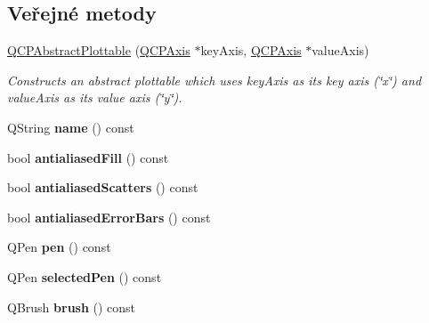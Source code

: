 \subsection*{Veřejné metody}
\begin{DoxyCompactItemize}
\item 
\hyperlink{classQCPAbstractPlottable_af78a036e40db6f53a31abadc5323715a}{Q\+C\+P\+Abstract\+Plottable} (\hyperlink{classQCPAxis}{Q\+C\+P\+Axis} $\ast$key\+Axis, \hyperlink{classQCPAxis}{Q\+C\+P\+Axis} $\ast$value\+Axis)
\begin{DoxyCompactList}\small\item\em Constructs an abstract plottable which uses {\itshape key\+Axis} as its key axis (\char`\"{}x\char`\"{}) and {\itshape value\+Axis} as its value axis (\char`\"{}y\char`\"{}). \end{DoxyCompactList}\item 
\hypertarget{classQCPAbstractPlottable_a1affc1972938e4364a9325e4e4e4dcea}{}Q\+String {\bfseries name} () const \label{classQCPAbstractPlottable_a1affc1972938e4364a9325e4e4e4dcea}

\item 
\hypertarget{classQCPAbstractPlottable_a68d1c358db03faae376ec47c589abf27}{}bool {\bfseries antialiased\+Fill} () const \label{classQCPAbstractPlottable_a68d1c358db03faae376ec47c589abf27}

\item 
\hypertarget{classQCPAbstractPlottable_aefc379bcc011660a5371ecc6088a97eb}{}bool {\bfseries antialiased\+Scatters} () const \label{classQCPAbstractPlottable_aefc379bcc011660a5371ecc6088a97eb}

\item 
\hypertarget{classQCPAbstractPlottable_a630cfb27ff99ab4373b09631748fcf4a}{}bool {\bfseries antialiased\+Error\+Bars} () const \label{classQCPAbstractPlottable_a630cfb27ff99ab4373b09631748fcf4a}

\item 
\hypertarget{classQCPAbstractPlottable_a41d060007cc6b3037c9c04d22d0c0398}{}Q\+Pen {\bfseries pen} () const \label{classQCPAbstractPlottable_a41d060007cc6b3037c9c04d22d0c0398}

\item 
\hypertarget{classQCPAbstractPlottable_a006065572c5add883a944ea4cda699f3}{}Q\+Pen {\bfseries selected\+Pen} () const \label{classQCPAbstractPlottable_a006065572c5add883a944ea4cda699f3}

\item 
\hypertarget{classQCPAbstractPlottable_aa74cdceb9c7286ef116fbfa58e0326e7}{}Q\+Brush {\bfseries brush} () const \label{classQCPAbstractPlottable_aa74cdceb9c7286ef116fbfa58e0326e7}


\end{DoxyCompactItemize}
